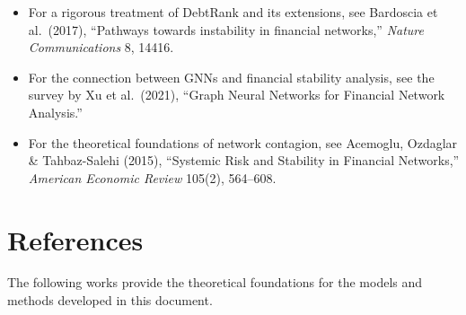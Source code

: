 \documentclass[11pt, a4paper]{article}
\theoremstyle{definition}
\theoremstyle{plain}
\theoremstyle{remark}
\begin{document}
\begin{refbox}
\begin{itemize}
    \item For a rigorous treatment of DebtRank and its extensions, see
          Bardoscia et al.\ (2017), ``Pathways towards instability in financial
          networks,'' \textit{Nature Communications} 8, 14416.
    \item For the connection between GNNs and financial stability analysis, see
          the survey by Xu et al.\ (2021), ``Graph Neural Networks for Financial
          Network Analysis.''
    \item For the theoretical foundations of network contagion, see
          Acemoglu, Ozdaglar \& Tahbaz-Salehi (2015), ``Systemic Risk and
          Stability in Financial Networks,'' \textit{American Economic Review}
          105(2), 564--608.
\end{itemize}
\end{refbox}

\section{References}
\label{sec:references}

The following works provide the theoretical foundations for the models and methods
developed in this document.
\end{document}
